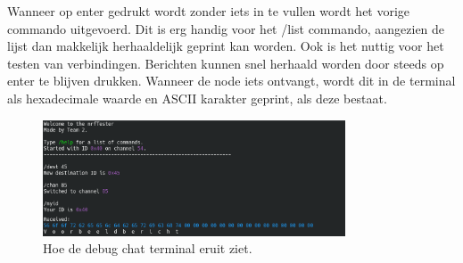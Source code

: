 Wanneer op enter gedrukt wordt zonder iets in te vullen wordt het vorige commando uitgevoerd. Dit is erg handig voor het /list commando, aangezien de lijst dan makkelijk herhaaldelijk geprint kan worden. Ook is het nuttig voor het testen van verbindingen. Berichten kunnen snel herhaald worden door steeds op enter te blijven drukken. Wanneer de node iets ontvangt, wordt dit in de terminal als hexadecimale waarde en ASCII karakter geprint, als deze bestaat. 

\begin{figure}[ht]
    \centering
    \includegraphics[width=0.8\textwidth]{img/nrfchat.png}
    \caption{Hoe de debug chat terminal eruit ziet.}
    \label{fig:debugTerminal}
\end{figure}





